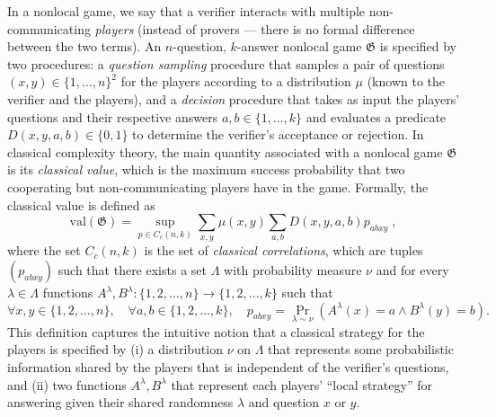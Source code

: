 \documentclass[11pt]{article}
\theoremstyle{definition}
\newcommand{\val}{\ensuremath{\mathrm{val}}}
\newcommand{\game}{\mathfrak{G}}
\begin{document}
In a nonlocal game, we say that a verifier interacts with multiple non-communicating \emph{players} (instead of provers --- there is no formal difference between the two terms). An $n$-question, $k$-answer nonlocal game $\game$ is specified by two procedures: a \emph{question sampling} procedure that samples a pair of questions $(x,y)\in \{1,\ldots,n\}^2$ for the players according to a distribution $\mu$ (known to the verifier and the players), and a \emph{decision} procedure that takes as input the players' questions and their respective answers $a,b\in\{1,\ldots,k\}$ and evaluates a predicate $D(x,y,a,b)\in \{0,1\}$ to determine the verifier's acceptance or rejection. In classical complexity theory, the main quantity associated with a nonlocal game $\game$ is its \emph{classical value}, which is the maximum success probability that two cooperating but non-communicating players have in the game. Formally, the classical value is defined as
\begin{equation}\label{eq:class-val}
 \val(\game) = \sup_{p\in C_c(n,k)} \sum_{x,y} \mu(x,y) \sum_{a,b} D(x,y,a,b) p_{abxy}\;,
\end{equation}
where the set $C_c(n,k)$ is the set of \emph{classical correlations}, which are tuples $(p_{abxy})$ such that there exists a set $\Lambda$ with probability measure $\nu$ and for every $\lambda \in \Lambda$ functions $A^\lambda,B^\lambda: \{1,2,\ldots,n\} \to \{1,2,\ldots,k\}$ such that
\[
	\forall x,y \in \{1,2,\ldots,n\}, \quad \forall a,b \in \{1,2,\ldots,k\}, \quad p_{abxy} = \Pr_{\lambda \sim \nu} (A^\lambda(x) = a \wedge B^\lambda(y) = b).
\]
%
 This definition captures the intuitive notion that a classical strategy for the players is specified by (i) a distribution $\nu$ on $\Lambda$ that represents some probabilistic information shared by the players that is independent of the verifier's questions, and (ii) two functions $A^\lambda,B^\lambda$ that represent each players' ``local strategy'' for answering given their shared randomness $\lambda$ and question $x$ or $y$. %
\end{document}

